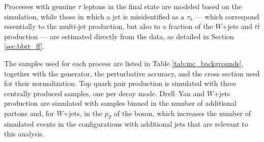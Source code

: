 Processes with genuine $\tau$ leptons in the final state are modeled based on the simulation, while those in which a jet is misidentified as a $\tau_h$ — which correspond essentially to the multi-jet production, but also to a fraction of the $W$+jets and $t\bar{t}$ production — are estimated directly from the data, as detailed in Section \ref{sec:bbtt_ff}.\medskip

The samples used for each process are listed in Table \ref{tab:mc_backgrounds}, together with the generator, the perturbative accuracy, and the cross section used for their normalization. Top quark pair production is simulated with three centrally produced samples, one per decay mode. Drell--Yan and $W$+jets production are simulated with samples binned in the number of additional partons and, for $W$+jets, in the $p_T$ of the boson, which increases the number of simulated events in the configurations with additional jets that are relevant to this analysis.

